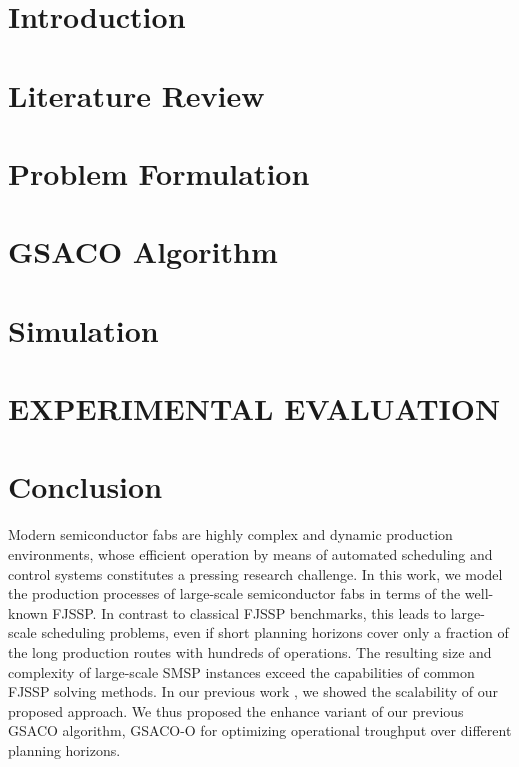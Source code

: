 \documentclass[runningheads]{llncs}
\begin{document}
\section{Introduction}
\label{sec:introduction}


\section{Literature Review}
\label{sec:lit_rev}


\section{Problem Formulation}
\label{sec:problem_f}


\section{GSACO Algorithm}
\label{sec:gsaco}


\section{Simulation}
\label{sec:sim}


\section{\uppercase{Experimental Evaluation}}
\label{sec:results}



\section{Conclusion}
\label{sec:conclusion}

Modern semiconductor fabs are highly complex and dynamic production
environments, whose efficient operation by means of automated scheduling
and control systems constitutes a pressing research challenge.
In this work, we model the production processes of large-scale
semiconductor fabs in terms of the well-known FJSSP.
In contrast to classical FJSSP benchmarks,
this leads to large-scale scheduling problems,
even if short planning horizons cover only a fraction of the long
production routes with hundreds of operations.
The resulting size and complexity of large-scale SMSP instances
exceed the capabilities of common FJSSP solving methods.
In our previous work \cite{Ali2024}, we showed the scalability of our proposed approach. 
We thus proposed the enhance variant of our previous GSACO algorithm, GSACO-O for optimizing operational troughput over different planning horizons.
\end{document}
